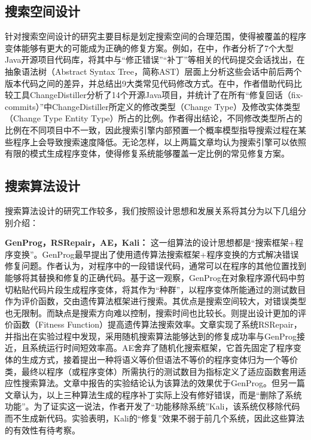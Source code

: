 \subsection{搜索空间设计}
针对搜索空间设计的研究主要目标是划定搜索空间的合理范围，使得被覆盖的程序变体能够有更大的可能成为正确的修复方案。例如，在\cite{pan2009toward}中，作者分析了7个大型Java开源项目代码库，将其中与“修正错误”“补丁”等相关的代码提交会话找出，在抽象语法树（Abstract Syntax Tree，简称AST）层面上分析这些会话中前后两个版本代码之间的差异，并总结出9大类常见代码修改方式。在\cite{martinez2015mining}中，作者借助代码比较工具ChangeDistiller\cite{changedistiller:4339230}分析了14个开源Java项目，并统计了在所有“修复回话（fix-commits）”中ChangeDistiller所定义的修改类型（Change Type）及修改实体类型（Change Type Entity Type）所占的比例。作者得出结论，不同修改类型所占的比例在不同项目中不一致，因此搜索引擎内部预置一个概率模型指导搜索过程在某些程序上会导致搜索速度降低。无论怎样，以上两篇文章均认为搜索引擎可以依照有限的模式生成程序变体，使得修复系统能够覆盖一定比例的常见修复方案。

\subsection{搜索算法设计}

搜索算法设计的研究工作较多，我们按照设计思想和发展关系将其分为以下几组分别介绍：

\textbf{GenProg，RSRepair，AE，Kali：}
这一组算法的设计思想都是“搜索框架+程序变换”。GenProg\cite{6035728}\cite{6227211}最早提出了使用遗传算法搜索框架+程序变换的方式解决错误修复问题。作者认为，对程序中的一段错误代码，通常可以在程序的其他位置找到能够将其替换和修复的正确代码。基于这一观察，GenProg在对象程序源代码中剪切粘贴代码片段生成程序变体，将其作为“种群”，以程序变体所能通过的测试数目作为评价函数，交由遗传算法框架进行搜索。其优点是搜索空间较大，对错误类型也无限制。而缺点是搜索方向难以控制，搜索时间也比较长。\cite{Fast:2010:DBF:1830483.1830654}则提出设计更加的评价函数（Fitness Function）提高遗传算法搜索效率。文章\cite{Qi:2014:SRS:2568225.2568254}实现了系统RSRepair，并指出在实验过程中发现，采用随机搜索算法能够达到的修复成功率与GenProg接近，且系统运行时间短效率高。AE\cite{6693094}舍弃了随机化搜索框架，它首先固定了程序变体的生成方式，接着提出一种将语义等价但语法不等价的程序变体归为一个等价类，最终以程序（或程序变体）所需执行的测试数目为指标定义了适应函数套用适应性搜索算法。文章中报告的实验结论认为该算法的效果优于GenProg。但另一篇文章\cite{qi2015analysis}认为，以上三种算法生成的程序补丁实际上没有修好错误，而是“删除了系统功能”。为了证实这一说法，作者开发了“功能移除系统”Kali，该系统仅移除代码而不生成新代码。实验表明，Kali的“修复”效果不弱于前几个系统，因此这些算法的有效性有待考察。

